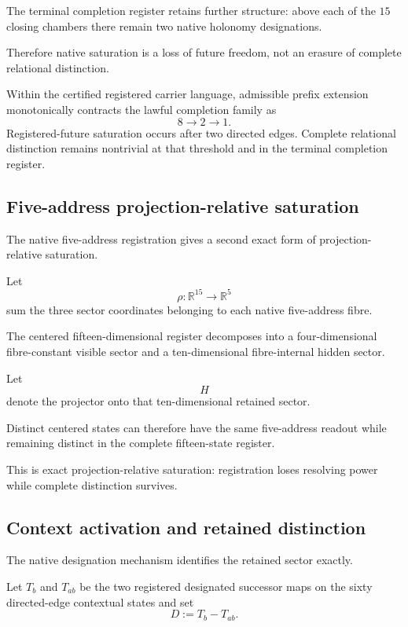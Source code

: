The terminal completion register retains further structure: above
each of the \(15\) closing chambers there remain two native holonomy
designations.

Therefore native saturation is a loss of future freedom, not an
erasure of complete relational distinction.

\begin{theorem}
Within the certified registered carrier language, admissible prefix
extension monotonically contracts the lawful completion family as
\[
8\longrightarrow2\longrightarrow1.
\]
Registered-future saturation occurs after two directed edges.
Complete relational distinction remains nontrivial at that threshold
and in the terminal completion register.
\end{theorem}

\subsection{Five-address projection-relative saturation}

The native five-address registration gives a second exact form of
projection-relative saturation.

Let
\[
\rho:\mathbb R^{15}\longrightarrow\mathbb R^5
\]
sum the three sector coordinates belonging to each native
five-address fibre.

The centered fifteen-dimensional register decomposes into a
four-dimensional fibre-constant visible sector and a ten-dimensional
fibre-internal hidden sector.

Let
\[
H
\]
denote the projector onto that ten-dimensional retained sector.

Distinct centered states can therefore have the same five-address
readout while remaining distinct in the complete fifteen-state
register.

This is exact projection-relative saturation:
registration loses resolving power while complete distinction
survives.

\subsection{Context activation and retained distinction}

The native designation mechanism identifies the retained sector
exactly.

Let \(T_b\) and \(T_{ab}\) be the two registered designated
successor maps on the sixty directed-edge contextual states and set
\[
D:=T_b-T_{ab}.
\]

